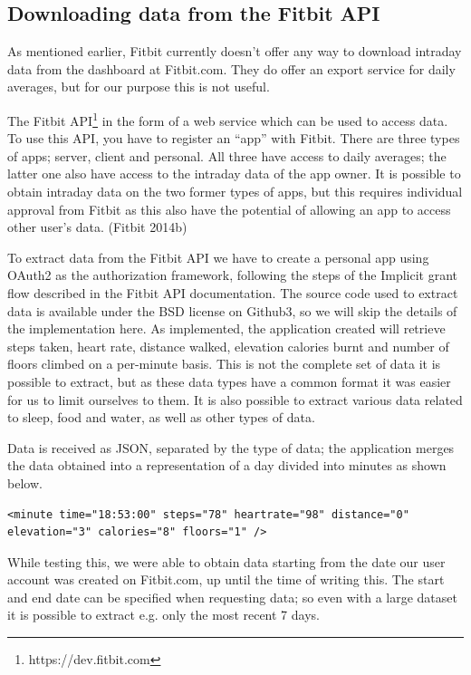 \documentclass[a4paper,11pt,dvips]{article}
\begin{document}
\subsection{Downloading data from the Fitbit API}
As mentioned earlier, Fitbit currently doesn't offer any way to download intraday data from the dashboard at Fitbit.com. They do offer an export service for daily averages, but for our purpose this is not useful.

The Fitbit API\footnote{https://dev.fitbit.com} in the form of a web service which can be used to access data. To use this API, you have to register an “app” with Fitbit. There are three types of apps; server, client and personal. All three have access to daily averages; the latter one also have access to the intraday data of the app owner. It is possible to obtain intraday data on the two former types of apps, but this requires individual approval from Fitbit as this also have the potential of allowing an app to access other user's data. (Fitbit 2014b)

To extract data from the Fitbit API we have to create a personal app using OAuth2 as the authorization framework, following the steps of the Implicit grant flow described in the Fitbit API documentation. The source code used to extract data is available under the BSD license on Github3, so we will skip the details of the implementation here. As implemented, the application created will retrieve steps taken, heart rate, distance walked, elevation calories burnt and number of floors climbed on a per-minute basis. This is not the complete set of data it is possible to extract, but as these data types have a common format it was easier for us to limit ourselves to them. It is also possible to extract various data related to sleep, food and water, as well as other types of data.

Data is received as JSON, separated by the type of data; the application merges the data obtained into a representation of a day divided into minutes as shown below.

\scriptsize
\begin{verbatim}
<minute time="18:53:00" steps="78" heartrate="98" distance="0" elevation="3" calories="8" floors="1" />
\end{verbatim}
\normalsize

While testing this, we were able to obtain data starting from the date our user account was created on Fitbit.com, up until the time of writing this. The start and end date can be specified when requesting data; so even with a large dataset it is possible to extract e.g. only the most recent 7 days.
\end{document}
